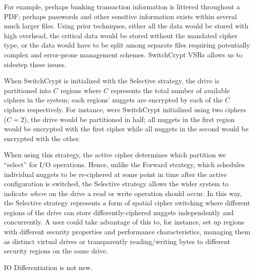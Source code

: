 For example,
perhaps banking transaction information is littered throughout a PDF; perhaps
passwords and other sensitive information exists within several much larger
files. Using prior techniques, either all the data would be stored with high
overhead, the critical data would be stored without the mandated cipher type, or
the data would have to be split among separate files requiring potentially
complex and error-prone management schemes. SwitchCrypt VSRs allows us to
sidestep these issues.






When SwitchCrypt is initialized with the
Selective strategy, the drive is partitioned into $C$ regions where $C$
represents the total number of available ciphers in the system; each regions'
nuggets are encrypted by each of the $C$ ciphers respectively. For instance,
were SwitchCrypt initialized using two ciphers ($C = 2$), the drive would be
partitioned in half; all nuggets in the first region would be encrypted with the
first cipher while all nuggets in the second would be encrypted with the other.

When using this strategy, the active cipher determines which partition we
``select'' for I/O operations. Hence, unlike the Forward strategy, which
schedules individual nuggets to be re-ciphered at some point in time after the
active configuration is switched, the Selective strategy allows the wider system
to indicate \emph{where} on the drive a read or write operation should occur. In
this way, the Selective strategy represents a form of spatial cipher switching
where different regions of the drive can store differently-ciphered nuggets
independently and concurrently. A user could take advantage of this to, for
instance, set up regions with different security properties and performance
characteristics, managing them as distinct virtual drives or transparently
reading/writing bytes to different security regions on the same drive.


IO Differentiation is not new. 


